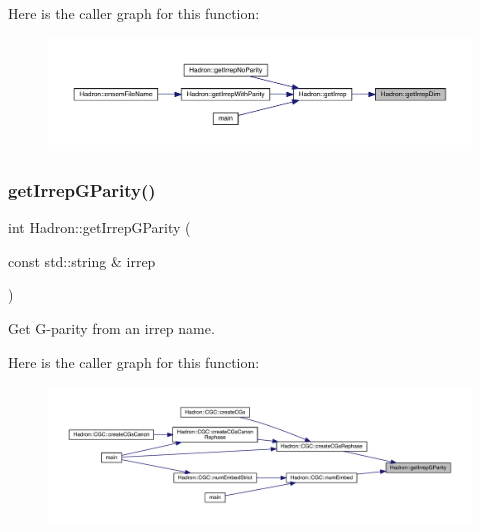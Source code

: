 Here is the caller graph for this function\+:
\nopagebreak
\begin{figure}[H]
\begin{center}
\leavevmode
\includegraphics[width=350pt]{d1/daf/namespaceHadron_a0451202d2f27c90c438c0d23da609c62_icgraph}
\end{center}
\end{figure}
\mbox{\label{namespaceHadron_a951cfb9d3a3b24aaf558d2e22513cec1}} 
\subsubsection{\texorpdfstring{getIrrepGParity()}{getIrrepGParity()}}
{\footnotesize\ttfamily int Hadron\+::get\+Irrep\+G\+Parity (\begin{DoxyParamCaption}\item[{const std\+::string \&}]{irrep }\end{DoxyParamCaption})}



Get G-\/parity from an irrep name. 

Here is the caller graph for this function\+:
\nopagebreak
\begin{figure}[H]
\begin{center}
\leavevmode
\includegraphics[width=350pt]{d1/daf/namespaceHadron_a951cfb9d3a3b24aaf558d2e22513cec1_icgraph}
\end{center}
\end{figure}
\mbox{\label{namespaceHadron_a79373fb0ae210931217ae33dc98f5ee9}} 
